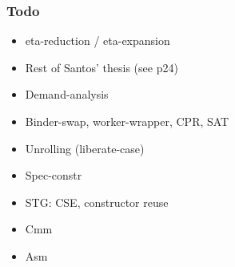 \documentclass[aspectratio=169]{beamer}
\begin{document}
\begin{frame}
  \frametitle{Todo}

  \begin{itemize}
    \item eta-reduction / eta-expansion
    \item Rest of Santos' thesis (see p24)
    \item Demand-analysis
    \item Binder-swap, worker-wrapper, CPR, SAT
    \item Unrolling (liberate-case)
    \item Spec-constr
    \item STG: CSE, constructor reuse
    \item Cmm
    \item Asm
  \end{itemize}

\end{frame}
\end{document}

